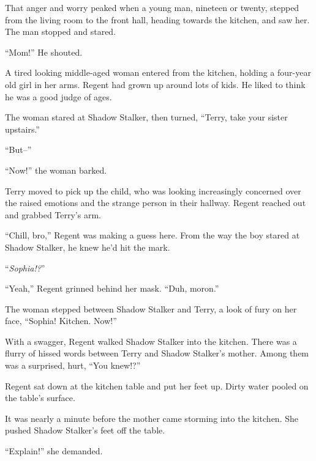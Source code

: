 That anger and worry peaked when a young man, nineteen or twenty, stepped from the living room to the front hall, heading towards the kitchen, and saw her.  The man stopped and stared.



``Mom!''  He shouted.



A tired looking middle-aged woman entered from the kitchen, holding a four-year old girl in her arms.  Regent had grown up around lots of kids.  He liked to think he was a good judge of ages.



The woman stared at Shadow Stalker, then turned, ``Terry, take your sister upstairs.''



``But--''



``Now!'' the woman barked.



Terry moved to pick up the child, who was looking increasingly concerned over the raised emotions and the strange person in their hallway.  Regent reached out and grabbed Terry's arm.



``Chill, bro,''  Regent was making a guess here.  From the way the boy stared at Shadow Stalker, he knew he'd hit the mark.



``\emph{Sophia!?}''



``Yeah,'' Regent grinned behind her mask.  ``Duh, moron.''



The woman stepped between Shadow Stalker and Terry, a look of fury on her face, ``Sophia!  Kitchen.  Now!''



With a swagger, Regent walked Shadow Stalker into the kitchen.  There was a flurry of hissed words between Terry and Shadow Stalker's mother.  Among them was a surprised, hurt, ``You knew!?''



Regent sat down at the kitchen table and put her feet up.  Dirty water pooled on the table's surface.



It was nearly a minute before the mother came storming into the kitchen.  She pushed Shadow Stalker's feet off the table.



``Explain!'' she demanded.



